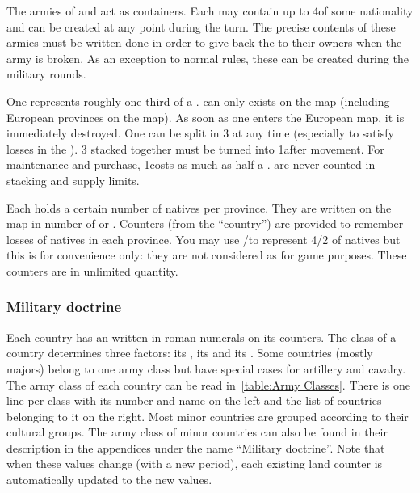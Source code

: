  The armies of  and 
act as containers. Each may contain up to 4\LD of some nationality and can be
created at any point during the turn. The precise contents of these armies
must be written done in order to give back the \LD to their owners when the
army is broken.
\bparag As an exception to normal rules, these \ARMY can be created during the
military rounds.

 One \LDE represents roughly one third of
a \LD.
\bparag \LDE can only exists on the \ROTW map (including European provinces on
the \ROTW map). As soon as one \LDE enters the European map, it is immediately
destroyed.
\bparag One \LD can be split in 3 \LDE at any time (especially to satisfy
losses in the \ROTW). 3 \LDE stacked together must be turned into 1\LD after
movement.
\bparag For maintenance and purchase, 1\LDE costs as much as half a \LD.
\bparag \LDE are never counted in stacking and supply limits.

\aparag[Natives.] Each \ROTW \Area holds a certain number of natives per
province. They are written on the \ROTW map in number of \LD or \LDE.
\bparag Counters (from the  ``country'') are provided to
remember losses of natives in each province. You may use
\ARMY\faceplus/\facemoins to represent 4/2 \LD of natives but this is for
convenience only: they are not considered as \ARMY for game purposes. These
counters are in unlimited quantity.


\subsubsection{Military doctrine}
\aparag Each country has an  written in roman numerals on
its counters.
\bparag The class of a country determines three factors: its , its
 and its .
\bparag Some countries (mostly majors) belong to one army class but have
special cases for artillery and cavalry.
\bparag The army class of each country can be read in~\ref{table:Army
  Classes}. There is one line per class with its number and name on the left
and the list of countries belonging to it on the right.
\bparag Most minor countries are grouped according to their cultural groups.
\bparag The army class of minor countries can also be found in their
description in the appendices under the name ``Military doctrine''.
\bparag Note that when these values change (with a new period), each existing
land counter is automatically updated to the new values.

